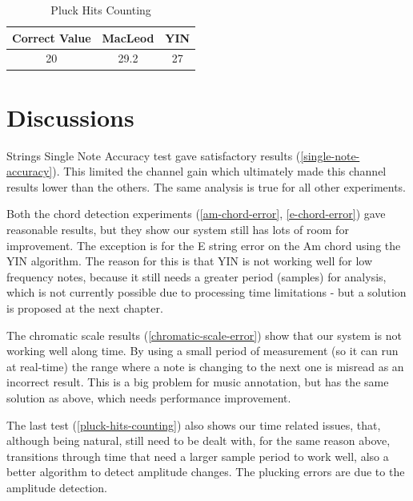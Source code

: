 \begin{table}[htb]
  \begin{center}
    \ABNTEXreducedfont
    \caption[Pluck Hits Counting]{Pluck Hits Counting}
    \label{pluck-hits-counting}
    \begin{tabular}{c|c|c}
      \hline
      Correct Value & MacLeod & YIN \\
      \hline
      20 & 29.2 & 27 \\
      \hline
    \end{tabular}
  \end{center}
\end{table}

\section{Discussions}
Strings Single Note Accuracy test gave satisfactory results (\autoref{single-note-accuracy}).
This limited the channel gain which ultimately made this
channel results lower than the others. The same analysis is true for
all other experiments.

Both the chord detection experiments (\autoref{am-chord-error}, \autoref{e-chord-error}) gave reasonable results, but they
show our system still has lots of room for improvement. The exception is for
the E string error on the Am chord using the YIN algorithm. The reason
for this is that YIN is not working well for low frequency notes, because
it still needs a greater period (samples) for analysis, which is not currently
possible due to processing time limitations - but a solution is proposed at
the next chapter.

The chromatic scale results (\autoref{chromatic-scale-error}) show that our system is not working well along time.
By using a small period of measurement (so it can run at real-time) the range
where a note is changing to the next one is misread as an incorrect result.
This is a big problem for music annotation, but has the same solution as above,
which needs performance improvement.

The last test (\autoref{pluck-hits-counting}) also shows our time related issues,
that, although being natural, still need to be dealt with, for the same reason above, transitions
through time that need a larger sample period to work well, also a better algorithm to detect
amplitude changes. The plucking errors are due to the amplitude detection.

